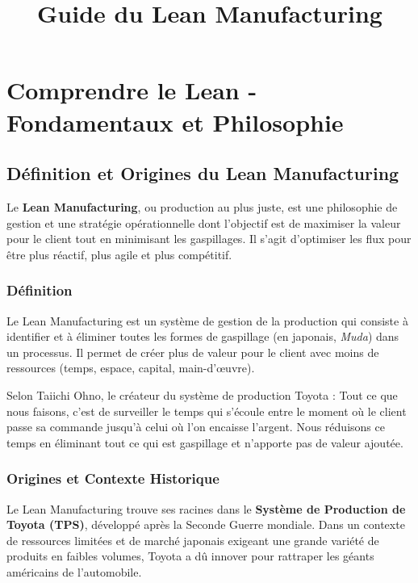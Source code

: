 \documentclass[a4paper,12pt]{article}
\begin{document}
\title{Guide du Lean Manufacturing}
\author{}
\date{}
\maketitle

\tableofcontents
\newpage

\section{Comprendre le Lean - Fondamentaux et Philosophie}

\subsection{Définition et Origines du Lean Manufacturing}

Le \textbf{Lean Manufacturing}, ou production au plus juste, est une philosophie de gestion et une stratégie opérationnelle dont l'objectif est de maximiser la valeur pour le client tout en minimisant les gaspillages. Il s'agit d'optimiser les flux pour être plus réactif, plus agile et plus compétitif.

\subsubsection{Définition}

Le Lean Manufacturing est un système de gestion de la production qui consiste à identifier et à éliminer toutes les formes de gaspillage (en japonais, \textit{Muda}) dans un processus. Il permet de créer plus de valeur pour le client avec moins de ressources (temps, espace, capital, main-d'œuvre).

Selon Taiichi Ohno, le créateur du système de production Toyota : \og Tout ce que nous faisons, c'est de surveiller le temps qui s'écoule entre le moment où le client passe sa commande jusqu'à celui où l'on encaisse l'argent. Nous réduisons ce temps en éliminant tout ce qui est gaspillage et n'apporte pas de valeur ajoutée. \fg

\subsubsection{Origines et Contexte Historique}

Le Lean Manufacturing trouve ses racines dans le \textbf{Système de Production de Toyota (TPS)}, développé après la Seconde Guerre mondiale. Dans un contexte de ressources limitées et de marché japonais exigeant une grande variété de produits en faibles volumes, Toyota a dû innover pour rattraper les géants américains de l'automobile.
\end{document}
